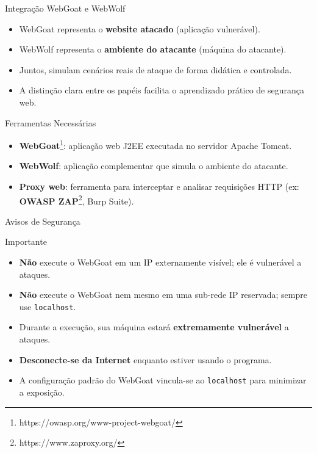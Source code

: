 \documentclass[aspectratio=169]{beamer}
\begin{document}
\begin{frame}{Integração WebGoat e WebWolf}
    \begin{itemize}
        \item WebGoat representa o \textbf{website atacado} (aplicação vulnerável).
        \item WebWolf representa o \textbf{ambiente do atacante} (máquina do atacante).
        \item Juntos, simulam cenários reais de ataque de forma didática e controlada.
        \item A distinção clara entre os papéis facilita o aprendizado prático de segurança web.
    \end{itemize}
\end{frame}

\begin{frame}{Ferramentas Necessárias}
    \begin{itemize}
        \item \textbf{WebGoat}\footnote{https://owasp.org/www-project-webgoat/}: aplicação web J2EE executada no servidor Apache Tomcat.
        \item \textbf{WebWolf}: aplicação complementar que simula o ambiente do atacante.
        \item \textbf{Proxy web}: ferramenta para interceptar e analisar requisições HTTP (ex: \textbf{OWASP ZAP}\footnote{https://www.zaproxy.org/}, Burp Suite).
        
    \end{itemize}
\end{frame}

\begin{frame}{Avisos de Segurança}
    \begin{alertblock}{Importante}
        \begin{itemize}
            \item \textbf{Não} execute o WebGoat em um IP externamente visível; ele é vulnerável a ataques.
            \item \textbf{Não} execute o WebGoat nem mesmo em uma sub-rede IP reservada; sempre use \texttt{localhost}.
            \item Durante a execução, sua máquina estará \textbf{extremamente vulnerável} a ataques.
            \item \textbf{Desconecte-se da Internet} enquanto estiver usando o programa.
            \item A configuração padrão do WebGoat vincula-se ao \texttt{localhost} para minimizar a exposição.
        \end{itemize}
    \end{alertblock}
\end{frame}
\end{document}
